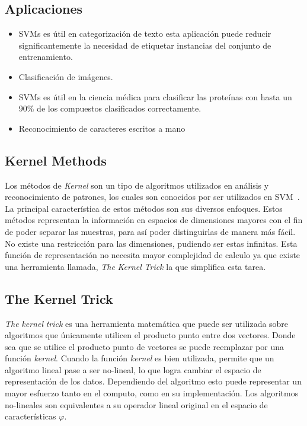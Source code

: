\subsection{Aplicaciones}
\begin{itemize}
\item SVMs es útil en categorización de texto esta aplicación puede reducir significantemente la necesidad de etiquetar instancias del conjunto de entrenamiento.
\item Clasificación de imágenes. 
\item SVMs es útil en la ciencia médica para clasificar las proteínas con hasta un 90\% de los compuestos clasificados correctamente.
\item Reconocimiento de caracteres escritos a mano
\end{itemize}

\subsection{Kernel Methods}\label{subsec:kernel_methods}

Los métodos de \textit{Kernel} son un tipo de algoritmos utilizados en análisis y reconocimiento de patrones, los cuales son conocidos por ser utilizados en SVM~\cite{kernels}. La principal característica de estos métodos son sus diversos enfoques. Estos métodos representan la información en espacios de dimensiones mayores con el fin de poder separar las muestras, para así poder distinguirlas de manera más fácil. No existe una restricción para las dimensiones, pudiendo ser estas infinitas. Esta función de representación no necesita mayor complejidad de calculo ya que existe una herramienta llamada, \textit{The} \textit{Kernel} \textit{Trick} la que simplifica esta tarea.

\subsection{The Kernel Trick}

\textit{The} \textit{kernel} \textit{trick} es una herramienta matemática que puede ser utilizada sobre algoritmos que únicamente utilicen el producto punto entre dos vectores. Donde sea que se utilice el producto punto de vectores se puede reemplazar por una función \textit{kernel}. Cuando la función \textit{kernel} es bien utilizada, permite que un algoritmo lineal pase a ser no-lineal, lo que logra cambiar el espacio de representación de los datos. Dependiendo del algoritmo esto puede representar un mayor esfuerzo tanto en el computo, como en su implementación. Los algoritmos no-lineales son equivalentes a su operador lineal original en el espacio de características $\varphi$.

